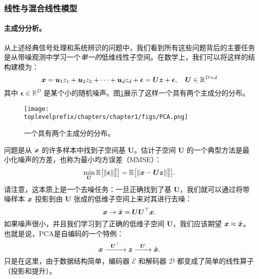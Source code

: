 \documentclass[../../book-main_zh.tex]{subfiles}
\begin{document}

\subsubsection{线性与混合线性模型}
\label{sec:PCA-ICA}
\paragraph{主成分分析。}
从上述经典信号处理和系统辨识的问题中，我们看到所有这些问题背后的主要任务是从带噪观测中学习一个{\em 单一的}低维线性子空间。在数学上，我们可以将这样的结构建模为：
\begin{equation}
    \bm{x} = \boldsymbol{u}_1 z_1 + \boldsymbol{u}_2 z_2 + \cdots + \boldsymbol{u}_d z_d + \boldsymbol{\epsilon} =  \boldsymbol{U} \bm{z} + \boldsymbol{\epsilon}, \quad \boldsymbol{U} \in \mathbb{R}^{D\times d}
    \label{eqn:PCA-model}
\end{equation}
其中 $\boldsymbol{\epsilon} \in \mathbb{R}^D$ 是某个小的随机噪声。图\ref{fig:PCA}展示了这样一个具有两个主成分的分布。
\begin{figure}
    \centering
    \texttt{[image: \\toplevelprefix/chapters/chapter1/figs/PCA.png]}
    \caption{一个具有两个主成分的分布。}
    \label{fig:PCA}
\end{figure}
问题是从 $\bm{x}$ 的许多样本中找到子空间基 $\boldsymbol{U}$。估计子空间 $\boldsymbol{U}$ 的一个典型方法是最小化噪声的方差，也称为最小均方误差（MMSE）：
\begin{equation}
    \min_{\boldsymbol{U}} \mathbb{E}\big[\|\boldsymbol{\epsilon}\|_2^2\big] = \mathbb{E}\big[\|\bm{x} - \boldsymbol{U} \bm{z}\|_2^2\big].
\end{equation}
请注意，这本质上是一个去噪任务：一旦正确找到了基 $\boldsymbol{U}$，我们就可以通过将带噪样本 $\bm{x}$ 投影到由 $\boldsymbol{U}$ 张成的低维子空间上来对其进行去噪：
\begin{equation}
\bm{x} \rightarrow \hat {\bm{x}} = \boldsymbol{U}\boldsymbol{U}^\top \bm{x}. 
\end{equation}
如果噪声很小，并且我们学习到了正确的低维子空间 $\boldsymbol{U}$，我们应该期望 $\bm{x} \approx \hat {\bm{x}}$。也就是说，PCA是自编码的一个特例：
\begin{equation}
    \bm{x}   \xrightarrow{\hspace{2mm} \boldsymbol{U}^\top\hspace{2mm}} \bm{z}  \xrightarrow{\hspace{2mm} \boldsymbol{U} \hspace{2mm}} \hat {\bm{x}}.
       \label{eqn:auto-encoding-PCA}
\end{equation}
只是在这里，由于数据结构简单，编码器 $\mathcal{E}$ 和解码器 $\mathcal{D}$ 都变成了简单的线性算子（投影和提升）。
\end{document}

